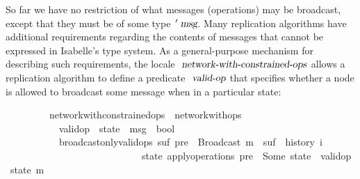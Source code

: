 So far we have no restriction of what messages (operations) may be broadcast, except that they must be of some type $\isacharprime\isa{msg}$.
Many replication algorithms have additional requirements regarding the contents of messages that cannot be expressed in Isabelle's type system.
As a general-purpose mechanism for describing such requirements, the locale $\isa{network-with-constrained-ops}$ allows a replication algorithm to define a predicate $\isa{valid-op}$ that specifies whether a node is allowed to broadcast some message when in a particular state:
\vspace{0.375em}
\begin{isabellebody}
\ \ \ \ \ \ \ \ \ network{\isacharunderscore}with{\isacharunderscore}constrained{\isacharunderscore}ops\ {\isacharequal}\ network{\isacharunderscore}with{\isacharunderscore}ops\ {\isacharplus}\isanewline
\ \ \ \ \ \ \ \ \ \ \ valid{\isacharunderscore}op\ {\isacharcolon}{\isacharcolon}\ {\isachardoublequoteopen}{\isacharprime}state\ {\isasymRightarrow}\ {\isacharprime}msg\ {\isasymRightarrow}\ bool{\isachardoublequoteclose}\isanewline
\ \ \ \ \ \ \ \ \ \ \ broadcast{\isacharunderscore}only{\isacharunderscore}valid{\isacharunderscore}ops{\isacharcolon}\ {\isachardoublequoteopen}{\isasymexists}suf{\isachardot}\ pre\ {\isacharat}\ {\isacharbrackleft}Broadcast\ m{\isacharbrackright}\ {\isacharat}\ suf\ {\isacharequal}\ history\ i \ {\isasymLongrightarrow}\isanewline
\ \ \ \ \ \ \ \ \ \ \ \ \ \ \ \ \ \ \ \ \ \ \ \ \ \ \ \ {\isasymexists}state{\isachardot}\ apply{\isacharunderscore}operations\ pre\ {\isacharequal}\ Some\ state\ {\isasymand}\ valid{\isacharunderscore}op\ state\ m{\isachardoublequoteclose}
\end{isabellebody}
\vspace{0.375em}

